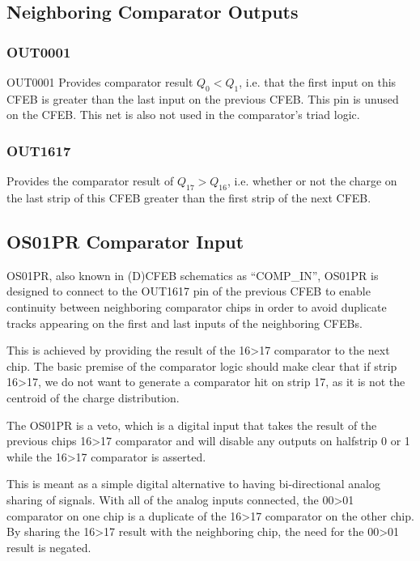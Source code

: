 \documentclass[letterpaper]{article}
\begin{document}
\subsection{Neighboring Comparator Outputs}

\subsubsection{OUT0001}
        OUT0001 Provides comparator result $Q_{0}<Q_{1}$, i.e. that the first input on this CFEB is greater than the last input on the previous CFEB. This pin is unused on the CFEB. This net is also not used in the comparator's triad logic.

\subsubsection{OUT1617}

        Provides the comparator result of $Q_{17}>Q_{16}$, i.e. whether or not the charge on the last strip of this CFEB greater than the first strip of the next CFEB.

\subsection{OS01PR Comparator Input}\label{sec:compin}

OS01PR, also known in (D)CFEB schematics as ``COMP\_IN'', OS01PR is designed to connect to the OUT1617 pin of the previous CFEB to enable continuity between neighboring comparator chips in order to avoid duplicate tracks appearing on the first and last inputs of the neighboring CFEBs.

This is achieved by providing the result of the 16>17 comparator to the next chip. The basic premise of the comparator logic should make clear that if strip 16>17, we do not want to generate a comparator hit on strip 17, as it is not the centroid of the charge distribution.

The OS01PR is a veto, which is a digital input that takes the result of the previous chips 16>17 comparator and will disable any outputs on halfstrip 0 or 1 while the 16>17 comparator is asserted.

This is meant as a simple digital alternative to having bi-directional analog sharing of signals. With all of the analog inputs connected, the 00>01 comparator on one chip is a duplicate of the 16>17 comparator on the other chip. By sharing the 16>17 result with the neighboring chip, the need for the 00>01 result is negated.
\end{document}
